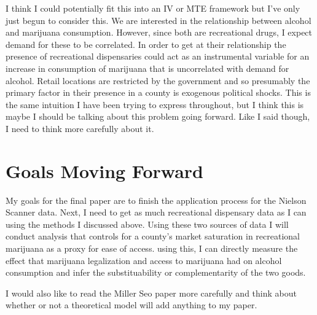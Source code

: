 \documentclass[11pt]{article}
\begin{document}
I think I could potentially fit this into an IV or MTE framework but I've only just begun to consider this. We are interested in the relationship between alcohol and marijuana consumption. However, since both are recreational drugs, I expect demand for these to be correlated. In order to get at their relationship the presence of recreational dispensaries could act as an instrumental variable for an increase in consumption of marijuana that is uncorrelated with demand for alcohol. Retail locations are restricted by the government and so presumably the primary factor in their presence in a county is exogenous political shocks. This is the same intuition I have been trying to express throughout, but I think this is maybe I should be talking about this problem going forward. Like I said though, I need to think more carefully about it. \par 

\section{Goals Moving Forward}

My goals for the final paper are to finish the application process for the Nielson Scanner data. Next, I need to get as much recreational dispensary data as I can using the methods I discussed above. Using these two sources of data I will conduct analysis that controls for a county's market saturation in recreational marijuana as a proxy for ease of access. using this, I can directly measure the effect that marijuana legalization and access to marijuana had on alcohol consumption and infer the substituability or complementarity of the two goods. \par 

I would also like to read the Miller Seo  paper more carefully and think about whether or not a theoretical model will add anything to my paper.  












\end{document}
